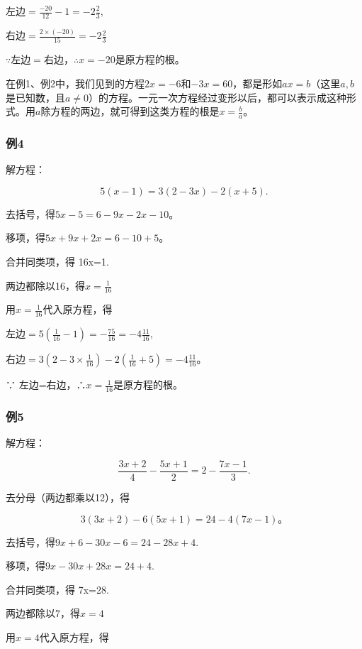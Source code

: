 左边\(= \frac{-20}{12} - 1 = -2\frac{2}{3},\)

右边\(= \frac{2\times(-20)}{15} = -2\frac{2}{3}\)

\(\because\)左边\(=\)右边，\(\therefore x = -20\)是原方程的根。

在例1、例2中，我们见到的方程\(2x = -6\)和\(-3x = 60\)，都是形如\(ax = b\)（这里\(a, b\)是已知数，且\(a \neq 0\)）的方程。一元一次方程经过变形以后，都可以表示成这种形式。用\(a\)除方程的两边，就可得到这类方程的根是\(x = \frac{b}{a}\)。

\subsubsection{例4}

解方程：

\[
5(x - 1) = 3(2 - 3x) - 2(x + 5).
\]

 去括号，得\(5x - 5 = 6 - 9x - 2x - 10\)。

移项，得\(5x + 9x + 2x = 6 - 10 + 5\)。

合并同类项，得 16x=1.

两边都除以16，得\(x = \frac{1}{16}\)

 用\(x = \frac{1}{16}\)代入原方程，得

左边\(= 5\left(\frac{1}{16} - 1\right) = -\frac{75}{16} = -4\frac{11}{16},\)

右边\(= 3\left(2 - 3 \times \frac{1}{16}\right) - 2\left(\frac{1}{16} + 5\right) = -4\frac{11}{16}\)。

∵ 左边=右边，∴\(x=\frac{1}{16}\)是原方程的根。

\subsubsection{例5}

解方程：

\[
\frac{3x + 2}{4} - \frac{5 x + 1}{2} = 2 - \frac{7 x - 1}{3}.
\]

 去分母（两边都乘以12），得

\[
3 (3 x + 2) - 6 (5 x + 1) = 24 - 4 (7 x - 1)\text{。}
\]

去括号，得\(9x + 6 - 30x - 6 = 24 - 28x + 4.\)

移项，得\(9x - 30x + 28x = 24 + 4.\)

合并同类项，得 7x=28.

两边都除以7，得\(x = 4\)

 用\(x = 4\)代入原方程，得

